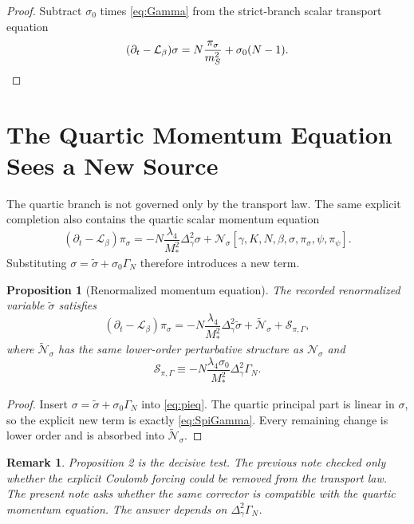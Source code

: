 \documentclass[11pt]{article}
\newcommand{\Ell}{\mathcal{L}}
\newtheorem{proposition}{Proposition}
\newtheorem{remark}{Remark}
\begin{document}
\begin{proof}
Subtract \(\sigma_0\) times \eqref{eq:Gamma} from the strict-branch scalar transport equation
\[
(\partial_t-\Ell_\beta)\sigma
=
N\frac{\pi_\sigma}{m_S^2}
+ \sigma_0(N-1).
\qedhere
\]
\end{proof}

\section{The Quartic Momentum Equation Sees a New Source}

The quartic branch is not governed only by the transport law. The same explicit completion also contains the quartic scalar momentum equation
\begin{equation}
(\partial_t-\Ell_\beta)\pi_\sigma
=
-N\frac{\lambda_4}{M_*^2}\Delta_\gamma^2\sigma
+ \mathcal N_\sigma[\gamma,K,N,\beta,\sigma,\pi_\sigma,\psi,\pi_\psi].
\label{eq:pieq}
\end{equation}
Substituting \(\sigma=\widetilde{\sigma}+\sigma_0\Gamma_N\) therefore introduces a new term.

\begin{proposition}[Renormalized momentum equation]
The recorded renormalized variable \(\widetilde{\sigma}\) satisfies
\begin{equation}
(\partial_t-\Ell_\beta)\pi_\sigma
=
-N\frac{\lambda_4}{M_*^2}\Delta_\gamma^2\widetilde{\sigma}
+ \widetilde{\mathcal N}_\sigma
+ \mathcal S_{\pi,\Gamma},
\label{eq:renpieq}
\end{equation}
where \(\widetilde{\mathcal N}_\sigma\) has the same lower-order perturbative structure as \(\mathcal N_\sigma\) and
\begin{equation}
\mathcal S_{\pi,\Gamma}
\equiv
-N\frac{\lambda_4\sigma_0}{M_*^2}\Delta_\gamma^2\Gamma_N.
\label{eq:SpiGamma}
\end{equation}
\end{proposition}

\begin{proof}
Insert \(\sigma=\widetilde{\sigma}+\sigma_0\Gamma_N\) into \eqref{eq:pieq}. The quartic principal part is linear in \(\sigma\), so the explicit new term is exactly \eqref{eq:SpiGamma}. Every remaining change is lower order and is absorbed into \(\widetilde{\mathcal N}_\sigma\).
\end{proof}

\begin{remark}
Proposition 2 is the decisive test. The previous note checked only whether the explicit Coulomb forcing could be removed from the transport law. The present note asks whether the same corrector is compatible with the quartic momentum equation. The answer depends on \(\Delta_\gamma^2\Gamma_N\).
\end{remark}
\end{document}
